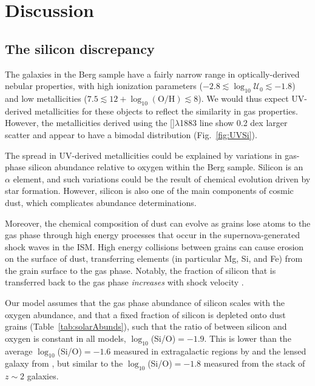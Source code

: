 \documentclass[preprint2]{aastex62}
\newcommand{\hii}{\ion{H}{2}}
\newcommand{\SiuIII}{[\ion{Si}{3}]}
\newcommand{\logten}{\ensuremath{\log_{10}}}
\newcommand{\logOH}{\ensuremath{\logten (\mathrm{O}/\mathrm{H})}\xspace}
\newcommand{\logU}{\ensuremath{\logten \mathcal{U}_0}}
\begin{document}
\section{Discussion}\label{sec:discussion}

\subsection{The silicon discrepancy}\label{sec:discussion:Si}

The galaxies in the Berg sample have a fairly narrow range in optically-derived nebular properties, with high ionization parameters ($-2.8 \lesssim \logU \lesssim -1.8$) and low metallicities ($7.5 \lesssim 12 + \logOH \lesssim 8 $). We would thus expect UV-derived metallicities for these objects to reflect the similarity in gas properties. However, the  metallicities derived using the \SiuIII$\lambda$1883 line show 0.2 dex larger scatter and appear to have a bimodal distribution (Fig.~\ref{fig:UVSi}). 

The spread in UV-derived metallicities could be explained by variations in gas-phase silicon abundance relative to oxygen within the Berg sample. Silicon is an $\alpha$ element, and such variations could be the result of chemical evolution driven by star formation. However, silicon is also one of the main components of cosmic dust, which complicates abundance determinations. 

Moreover, the chemical composition of dust can evolve as grains lose atoms to the gas phase through high energy processes that occur in the supernova-generated shock waves in the ISM. High energy collisions between grains can cause erosion on the surface of dust, transferring elements (in particular Mg, Si, and Fe) from the grain surface to the gas phase. Notably, the fraction of silicon that is transferred back to the gas phase \emph{increases} with shock velocity \citep[see review on depletion patterns and dust evolution in][]{Jones+2000}.

Our model assumes that the gas phase abundance of silicon scales with the oxygen abundance, and that a fixed fraction of silicon is depleted onto dust grains (Table~\ref{tab:solarAbunds}), such that the ratio of between silicon and oxygen is constant in all models, $\log_{10}$(Si/O)$=-1.9$. This is lower than the average $\log_{10}$(Si/O)$=-1.6$ measured in extragalactic \hii{} regions by \citet{Garnett+1995} and the lensed galaxy from \citet{Berg+2018}, but similar to the $\log_{10}$(Si/O)$=-1.8$ measured from the \citet{Steidel+2016} stack of $z\sim2$ galaxies.
\end{document}
